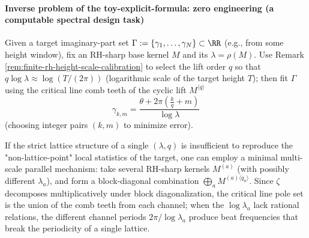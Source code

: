 \paragraph{Inverse problem of the toy-explicit-formula: zero engineering (a computable spectral design task)}
Given a target imaginary-part set \(\Gamma:=\{\gamma_1,\dots,\gamma_N\}\subset\RR\) (e.g., from some height window), fix an RH-sharp base kernel \(M\) and its \(\lambda=\rho(M)\).
Use Remark \ref{rem:finite-rh-height-scale-calibration} to select the lift order \(q\) so that \(q\log\lambda\approx \log(T/(2\pi))\) (logarithmic scale of the target height \(T\)); then fit \(\Gamma\) using the critical line comb teeth of the cyclic lift \(M^{\langle q\rangle}\)
\[
\gamma_{k,m}=\frac{\theta+2\pi(\frac{k}{q}+m)}{\log\lambda}
\]
(choosing integer pairs \((k,m)\) to minimize error).
\par
If the strict lattice structure of a single \((\lambda,q)\) is insufficient to reproduce the "non-lattice-point" local statistics of the target, one can employ a minimal multi-scale parallel mechanism: take several RH-sharp kernels \(M^{(a)}\) (with possibly different \(\lambda_a\)), and form a block-diagonal combination
\(
\bigoplus_a M^{(a)\langle q_a\rangle}
\).
Since \(\zeta\) decomposes multiplicatively under block diagonalization, the critical line pole set is the union of the comb teeth from each channel;
when the \(\log\lambda_a\) lack rational relations, the different channel periods \(2\pi/\log\lambda_a\) produce beat frequencies that break the periodicity of a single lattice.

